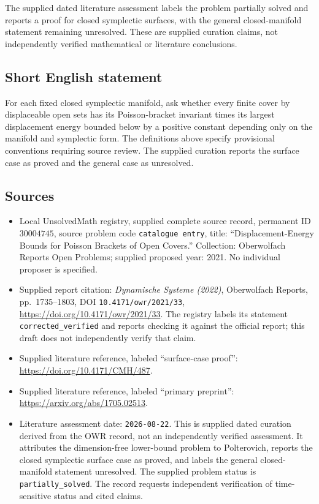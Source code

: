 \documentclass[11pt]{article}
\begin{document}
The supplied dated literature assessment labels the problem partially solved and reports a proof for closed symplectic surfaces, with the general closed-manifold statement remaining unresolved. These are supplied curation claims, not independently verified mathematical or literature conclusions.
\subsection{Short English statement}
For each fixed closed symplectic manifold, ask whether every finite cover by displaceable open sets has its Poisson-bracket invariant times its largest displacement energy bounded below by a positive constant depending only on the manifold and symplectic form. The definitions above specify provisional conventions requiring source review. The supplied curation reports the surface case as proved and the general case as unresolved.
\subsection{Sources}
\begin{itemize}
\item Local UnsolvedMath registry, supplied complete source record, permanent ID \(30004745\), source problem code \texttt{catalogue entry}, title: ``Displacement-Energy Bounds for Poisson Brackets of Open Covers.'' Collection: Oberwolfach Reports Open Problems; supplied proposed year: 2021. No individual proposer is specified.
\item Supplied report citation: \emph{Dynamische Systeme (2022)}, Oberwolfach Reports, pp.\ 1735--1803, DOI \texttt{10.4171/owr/2021/33}, \url{https://doi.org/10.4171/owr/2021/33}. The registry labels its statement \texttt{corrected\_verified} and reports checking it against the official report; this draft does not independently verify that claim.
\item Supplied literature reference, labeled ``surface-case proof'': \url{https://doi.org/10.4171/CMH/487}.
\item Supplied literature reference, labeled ``primary preprint'': \url{https://arxiv.org/abs/1705.02513}.
\item Literature assessment date: \texttt{2026-08-22}. This is supplied dated curation derived from the OWR record, not an independently verified assessment. It attributes the dimension-free lower-bound problem to Polterovich, reports the closed symplectic surface case as proved, and labels the general closed-manifold statement unresolved. The supplied problem status is \texttt{partially\_solved}. The record requests independent verification of time-sensitive status and cited claims.
\end{itemize}
\end{document}
